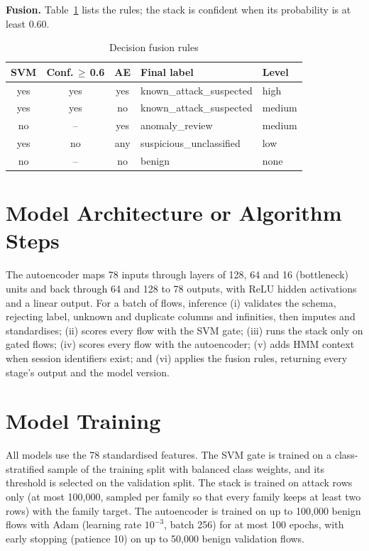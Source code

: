 \documentclass[12pt,a4paper,oneside]{report}
\begin{document}
\textbf{Fusion.} Table~\ref{tab:fusion} lists the rules; the stack is confident when its probability is at least 0.60.

\begin{table}[!htbp]
\centering
\caption{Decision fusion rules}
\label{tab:fusion}
\small
\begin{tabular}{@{}cccll@{}}
\toprule
\textbf{SVM} & \textbf{Conf.\,$\ge$\,0.6} & \textbf{AE} & \textbf{Final label} & \textbf{Level} \\
\midrule
yes & yes & yes & known\_attack\_suspected & high \\
yes & yes & no & known\_attack\_suspected & medium \\
no & -- & yes & anomaly\_review & medium \\
yes & no & any & suspicious\_unclassified & low \\
no & -- & no & benign & none \\
\bottomrule
\end{tabular}
\end{table}

\section{Model Architecture or Algorithm Steps}
The autoencoder maps 78 inputs through layers of 128, 64 and 16 (bottleneck) units and back through 64 and 128 to 78 outputs, with ReLU hidden activations and a linear output. For a batch of flows, inference (i) validates the schema, rejecting label, unknown and duplicate columns and infinities, then imputes and standardises; (ii) scores every flow with the SVM gate; (iii) runs the stack only on gated flows; (iv) scores every flow with the autoencoder; (v) adds HMM context when session identifiers exist; and (vi) applies the fusion rules, returning every stage's output and the model version.

\section{Model Training}
All models use the 78 standardised features. The SVM gate is trained on a class-stratified sample of the training split with balanced class weights, and its threshold is selected on the validation split. The stack is trained on attack rows only (at most 100,000, sampled per family so that every family keeps at least two rows) with the family target. The autoencoder is trained on up to 100,000 benign flows with Adam (learning rate $10^{-3}$, batch 256) for at most 100 epochs, with early stopping (patience 10) on up to 50,000 benign validation flows.
\end{document}
